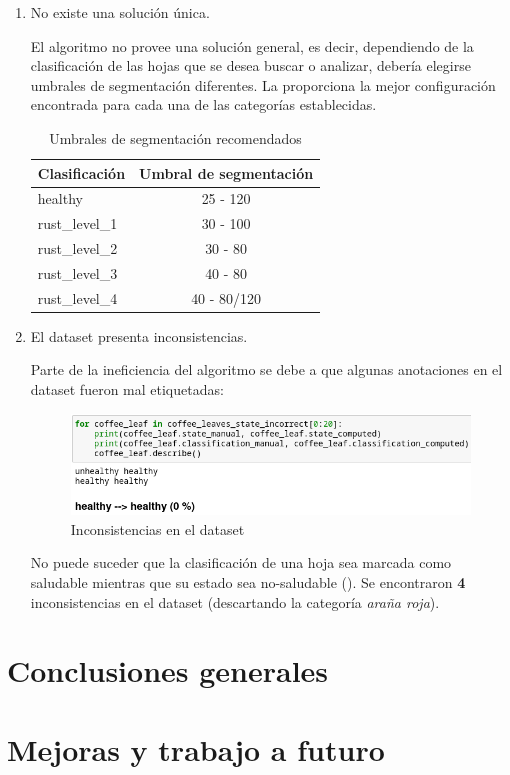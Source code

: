 \begin{enumerate}
\item No existe una solución única.

El algoritmo no provee una solución general, es decir, dependiendo de la clasificación de las hojas que se desea buscar o analizar, debería elegirse umbrales de segmentación diferentes. La  proporciona la mejor configuración encontrada para cada una de las categorías establecidas.

\begin{table}[H]
\centering
\begin{tabular}{|l|c|}
\hline 
\textbf{Clasificación} & \textbf{Umbral de segmentación} \\ 
\hline 
healthy & 25 - 120 \\ 
\hline 
rust\_level\_1 & 30 - 100 \\ 
\hline 
rust\_level\_2 & 30 - 80 \\ 
\hline 
rust\_level\_3 & 40 - 80 \\ 
\hline 
rust\_level\_4 & 40 - 80/120 \\ 
\hline 
\end{tabular}
\caption{Umbrales de segmentación recomendados}
\label{table:recommended_segmentation}
\end{table}

\item El dataset presenta inconsistencias.

Parte de la ineficiencia del algoritmo se debe a que algunas anotaciones en el dataset fueron mal etiquetadas:

\begin{figure}[H]
\centering
\includegraphics[width=\textwidth]{images/consideration_tag_error.png}
\caption{Inconsistencias en el dataset}
\label{img:dataset_inconsistencies}
\end{figure}

No puede suceder que la clasificación de una hoja sea marcada como saludable mientras que su estado sea no-saludable (). Se encontraron \textbf{4} inconsistencias en el dataset (descartando la categoría \textit{araña roja}).

\end{enumerate}

\section{Conclusiones generales}

\section{Mejoras y trabajo a futuro}
